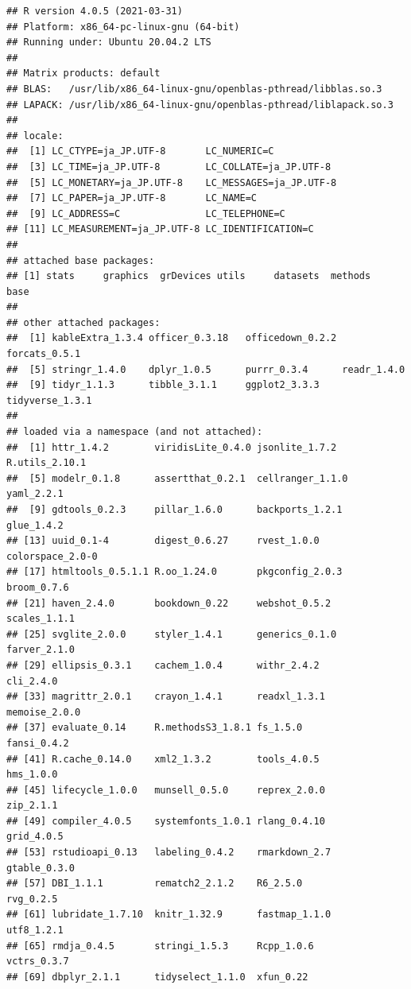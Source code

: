 \documentclass[
]{ltjsarticle}
\begin{document}
\begin{verbatim}
## R version 4.0.5 (2021-03-31)
## Platform: x86_64-pc-linux-gnu (64-bit)
## Running under: Ubuntu 20.04.2 LTS
## 
## Matrix products: default
## BLAS:   /usr/lib/x86_64-linux-gnu/openblas-pthread/libblas.so.3
## LAPACK: /usr/lib/x86_64-linux-gnu/openblas-pthread/liblapack.so.3
## 
## locale:
##  [1] LC_CTYPE=ja_JP.UTF-8       LC_NUMERIC=C              
##  [3] LC_TIME=ja_JP.UTF-8        LC_COLLATE=ja_JP.UTF-8    
##  [5] LC_MONETARY=ja_JP.UTF-8    LC_MESSAGES=ja_JP.UTF-8   
##  [7] LC_PAPER=ja_JP.UTF-8       LC_NAME=C                 
##  [9] LC_ADDRESS=C               LC_TELEPHONE=C            
## [11] LC_MEASUREMENT=ja_JP.UTF-8 LC_IDENTIFICATION=C       
## 
## attached base packages:
## [1] stats     graphics  grDevices utils     datasets  methods   base     
## 
## other attached packages:
##  [1] kableExtra_1.3.4 officer_0.3.18   officedown_0.2.2 forcats_0.5.1   
##  [5] stringr_1.4.0    dplyr_1.0.5      purrr_0.3.4      readr_1.4.0     
##  [9] tidyr_1.1.3      tibble_3.1.1     ggplot2_3.3.3    tidyverse_1.3.1 
## 
## loaded via a namespace (and not attached):
##  [1] httr_1.4.2        viridisLite_0.4.0 jsonlite_1.7.2    R.utils_2.10.1   
##  [5] modelr_0.1.8      assertthat_0.2.1  cellranger_1.1.0  yaml_2.2.1       
##  [9] gdtools_0.2.3     pillar_1.6.0      backports_1.2.1   glue_1.4.2       
## [13] uuid_0.1-4        digest_0.6.27     rvest_1.0.0       colorspace_2.0-0 
## [17] htmltools_0.5.1.1 R.oo_1.24.0       pkgconfig_2.0.3   broom_0.7.6      
## [21] haven_2.4.0       bookdown_0.22     webshot_0.5.2     scales_1.1.1     
## [25] svglite_2.0.0     styler_1.4.1      generics_0.1.0    farver_2.1.0     
## [29] ellipsis_0.3.1    cachem_1.0.4      withr_2.4.2       cli_2.4.0        
## [33] magrittr_2.0.1    crayon_1.4.1      readxl_1.3.1      memoise_2.0.0    
## [37] evaluate_0.14     R.methodsS3_1.8.1 fs_1.5.0          fansi_0.4.2      
## [41] R.cache_0.14.0    xml2_1.3.2        tools_4.0.5       hms_1.0.0        
## [45] lifecycle_1.0.0   munsell_0.5.0     reprex_2.0.0      zip_2.1.1        
## [49] compiler_4.0.5    systemfonts_1.0.1 rlang_0.4.10      grid_4.0.5       
## [53] rstudioapi_0.13   labeling_0.4.2    rmarkdown_2.7     gtable_0.3.0     
## [57] DBI_1.1.1         rematch2_2.1.2    R6_2.5.0          rvg_0.2.5        
## [61] lubridate_1.7.10  knitr_1.32.9      fastmap_1.1.0     utf8_1.2.1       
## [65] rmdja_0.4.5       stringi_1.5.3     Rcpp_1.0.6        vctrs_0.3.7      
## [69] dbplyr_2.1.1      tidyselect_1.1.0  xfun_0.22
\end{verbatim}


\renewcommand\refname{参考文献}
  
\end{document}
